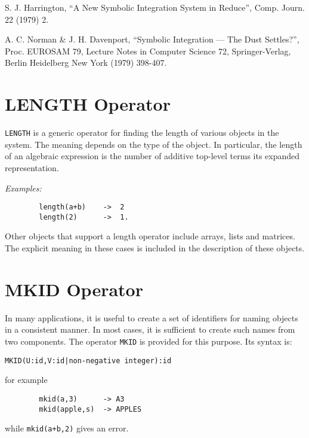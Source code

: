         S. J. Harrington, ``A New Symbolic Integration System in Reduce'',
                Comp. Journ. 22 (1979) 2.

        A. C. Norman \& J. H. Davenport, ``Symbolic Integration --- The Dust
                Settles?'', Proc. EUROSAM 79, Lecture Notes in Computer
                Science 72, Springer-Verlag, Berlin Heidelberg New York
                (1979) 398-407.

%
%
%

\section{LENGTH Operator}
{\tt LENGTH} is a generic operator for finding the
length of various objects in the system.  The meaning depends on the type
of the object.  In particular, the length of an algebraic expression is
the number of additive top-level terms its expanded representation.

{\it Examples:}
\begin{verbatim}
        length(a+b)    ->  2
        length(2)      ->  1.
\end{verbatim}
Other objects that support a length operator include arrays, lists and
matrices. The explicit meaning in these cases is included in the description
of these objects.

\section{MKID Operator}
In many applications, it is useful to create a set of identifiers for
naming objects in a consistent manner. In most cases, it is sufficient to
create such names from two components. The operator {\tt MKID} is provided
for this purpose. Its syntax is:
\begin{verbatim}
MKID(U:id,V:id|non-negative integer):id
\end{verbatim}
for example
\begin{verbatim}
        mkid(a,3)      -> A3
        mkid(apple,s)  -> APPLES
\end{verbatim}
while {\tt mkid(a+b,2)} gives an error.

